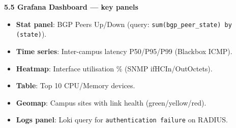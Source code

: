 \documentclass[11pt]{article}
\begin{document}
\begin{exoresolu}
\medskip
\textbf{5.5 Grafana Dashboard — key panels}
\begin{itemize}
    \item \textbf{Stat panel}: BGP Peers Up/Down (query: \texttt{sum(bgp\_peer\_state) by (state)}).
    \item \textbf{Time series}: Inter-campus latency P50/P95/P99 (Blackbox ICMP).
    \item \textbf{Heatmap}: Interface utilisation \% (SNMP ifHCIn/OutOctets).
    \item \textbf{Table}: Top 10 CPU/Memory devices.
    \item \textbf{Geomap}: Campus sites with link health (green/yellow/red).
    \item \textbf{Logs panel}: Loki query for \texttt{authentication failure} on RADIUS.
\end{itemize}
\end{exoresolu}
\end{document}
